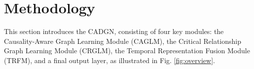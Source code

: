 \documentclass[lettersize,journal]{IEEEtran}
\newtheorem{definition}{\textbf{Definition}}[section]
\begin{document}

\vspace{-5pt}
\section{Methodology}
\label{section:framework}
This section introduces the CADGN, consisting of four key modules: the Causality-Aware Graph Learning Module (CAGLM), the Critical Relationship Graph Learning Module (CRGLM), the Temporal Representation Fusion Module (TRFM), and a final output layer, as illustrated in Fig. \ref{fig:overview}.

\end{document}
